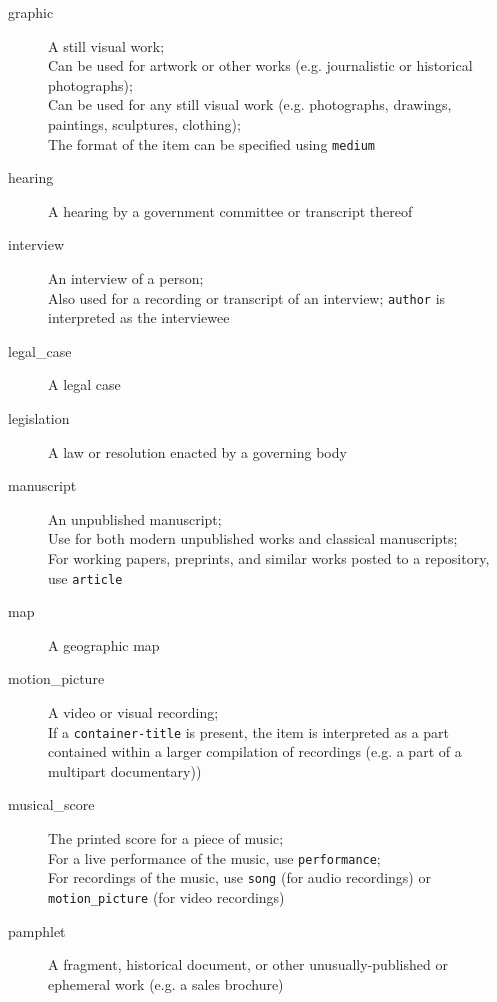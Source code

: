 \begin{description}
  \item[graphic]
    A still visual work;\\
    Can be used for artwork or other works (e.g. journalistic or historical
    photographs);\\
    Can be used for any still visual work (e.g. photographs, drawings,
    paintings, sculptures, clothing);\\
    The format of the item can be specified using \texttt{medium}

  \item[hearing]
    A hearing by a government committee or transcript thereof

  \item[interview]
    An interview of a person;\\
    Also used for a recording or transcript of an interview; \texttt{author}
    is interpreted as the interviewee

  \item[legal\_case]
    A legal case

  \item[legislation]
    A law or resolution enacted by a governing body

  \item[manuscript]
    An unpublished manuscript;\\
    Use for both modern unpublished works and classical manuscripts;\\
    For working papers, preprints, and similar works posted to a repository,
    use \texttt{article}

  \item[map]
    A geographic map

  \item[motion\_picture]
    A video or visual recording;\\
    If a \texttt{container-title} is present, the item is interpreted as a
    part contained within a larger compilation of recordings (e.g. a part of
    a multipart documentary))

  \item[musical\_score]
    The printed score for a piece of music;\\
    For a live performance of the music, use \texttt{performance};\\
    For recordings of the music, use \texttt{song} (for audio recordings) or
    \texttt{motion\_picture} (for video recordings)

  \item[pamphlet]
    A fragment, historical document, or other unusually-published or
    ephemeral work (e.g. a sales brochure)


\end{description}

